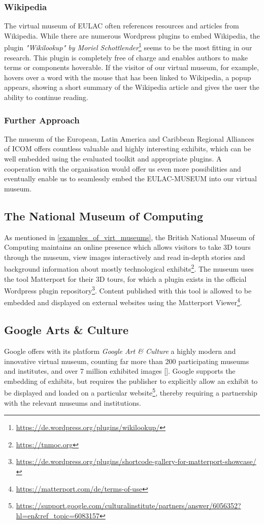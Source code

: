 \subsubsection{Wikipedia}

The virtual museum of EULAC often references resources and articles from Wikipedia. While there are numerous Wordpress plugins to embed Wikipedia, the plugin \emph{"Wikilookup" by Moriel Schottlender}\footnote{\url{https://de.wordpress.org/plugins/wikilookup/}} seems to be the most fitting in our research. This plugin is completely free of charge and enables authors to make terms or components hoverable. If the visitor of our virtual museum, for example, hovers over a word with the mouse that has been linked to Wikipedia, a popup appears, showing a short summary of the Wikipedia article and gives the user the ability to continue reading. 


\subsubsection{Further Approach}

The museum of the European, Latin America and Caribbean Regional Alliances of ICOM offers countless valuable and highly interesting exhibits, which can be well embedded using the evaluated toolkit and appropriate plugins. A cooperation with the organisation would offer us even more possibilities and eventually enable us to seamlessly embed the EULAC-MUSEUM into our virtual museum. 

\subsection{The National Museum of Computing}

As mentioned in \ref{examples_of_virt_museums}, the British National Museum of Computing maintains an online presence which allows visitors to take 3D tours through the museum, view images interactively and read in-depth stories and background information about mostly technological exhibits\footnote{\url{https://tnmoc.org}}. The museum uses the tool Matterport for their 3D tours, for which a plugin exists in the official Wordpress plugin repository\footnote{\url{https://de.wordpress.org/plugins/shortcode-gallery-for-matterport-showcase/}}. Content published with this tool is allowed to be embedded and displayed on external websites using the Matterport Viewer\footnote{\url{https://matterport.com/de/terms-of-use}}.


\subsection{Google Arts \& Culture}

Google offers with its platform \emph{Google Art \& Culture} a highly modern and innovative virtual museum, counting far more than 200 participating museums and institutes, and over 7 million exhibited images [\cite[3]{googleArts}]. Google supports the embedding of exhibits, but requires the publisher to explicitly allow an exhibit to be displayed and loaded on a particular website\footnote{\url{https://support.google.com/culturalinstitute/partners/answer/6056352?hl=en&ref_topic=6083157}}, thereby requiring a partnership with the relevant museums and institutions.
